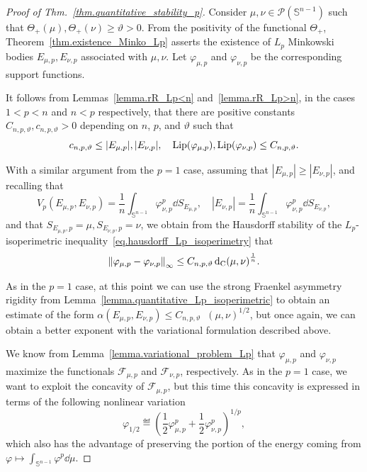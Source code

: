 \documentclass[a4paper, 10pt, twoside]{amsart}
\numberwithin{equation}{section}
\theoremstyle{plain}
\theoremstyle{definition}
\DeclareMathOperator{\dc}{\mathrm{d}_\mathrm{C}}
\begin{document}
\begin{proof}[Proof of Thm.~\ref{thm.quantitative_stability_p}]
    Consider $\mu,\nu \in \mathscr{P}(\mathbb{S}^{n-1})$ such that $\Theta_+(\mu),\Theta_+(\nu) \ge \vartheta > 0$. From the positivity of the functional $\Theta_+$, Theorem~\ref{thm.existence_Minko_Lp} asserts the existence of $L_p$ Minkowski bodies $E_{\mu,p},E_{\nu,p}$ associated with $\mu,\nu$. Let $\varphi_{\mu,p}$ and $\varphi_{\nu,p}$ be the corresponding support functions. 
    
    
    It follows from Lemmas~\ref{lemma.rR_Lp<n} and~\ref{lemma.rR_Lp>n}, in the cases $1 < p < n$ and $n < p$ respectively, that there are positive constants 
    $C_{n,p,\vartheta},c_{n,p,\vartheta}>0$ depending on $n$, $p$, and $\vartheta$ such that
    \[
        c_{n,p,\vartheta} \le |E_{\mu,p}|,|E_{\nu,p}|, \quad 
        \mathop{\rm Lip}(\varphi_{\mu,p}), \mathop{\rm Lip}(\varphi_{\nu,p}) \le C_{n,p,\vartheta}. 
    \]

    With a similar argument from the $p = 1$ case, assuming that $|E_{\mu,p}| \ge |E_{\nu,p}|$, and recalling that 
    \[  
        V_p(E_{\mu,p},E_{\nu,p}) = 
        \frac{1}{n}\int_{\mathbb{S}^{n-1}} \varphi_{\nu,p}^p\dd S_{E_{\mu,p}},
        \quad
        |E_{\nu,p}| = 
        \frac{1}{n}\int_{\mathbb{S}^{n-1}} \varphi_{\nu,p}^p\dd S_{E_{\nu,p}},
    \]
    and that $S_{E_{\mu,p},p}=\mu,S_{E_{\nu,p},p}=\nu$, we obtain from the Hausdorff stability of the $L_p$-isoperimetric inequality~\eqref{eq.hausdorff_Lp_isoperimetry} that 
    \begin{equation}\label{eq.premilary_Lp_stability}
        \norm{\varphi_{\mu,p} - \varphi_{\nu,p}}_\infty
        \le  C_{n,p,\vartheta} \, {\dc(\mu,\nu)}^{\frac{1}{n}}.
    \end{equation}

    As in the $p = 1$ case, at this point we can use the strong Fraenkel asymmetry rigidity from Lemma~\ref{lemma.quantitative_Lp_isoperimetric} to obtain an estimate of the form $\alpha(E_{\mu,p},E_{\nu,p}) \le C_{n,p,\vartheta} {\dc(\mu,\nu)}^{1/2}$, but once again, we can obtain a better exponent with the variational formulation described above.

    We know from Lemma~\ref{lemma.variational_problem_Lp} that $\varphi_{\mu,p}$ and $\varphi_{\nu,p}$ maximize the functionals $\mathscr{F}_{\mu,p}$ and $\mathscr{F}_{\nu,p}$, respectively. As in the $p=1$ case, we want to exploit the concavity of $\mathscr{F}_{\mu,p}$, but this time this concavity is expressed in terms of the following nonlinear variation 
    \[
        \varphi_{1/2} \eqdef {\left(\frac{1}{2}\varphi_{\mu,p}^p + \frac{1}{2}\varphi_{\nu,p}^p\right)}^{1/p},
    \] 
    which also has the advantage of preserving the portion of the energy coming from $\varphi \mapsto \int_{\mathbb{S}^{n-1}} \varphi^p \dd \mu$. 
    

\end{proof}
\end{document}
